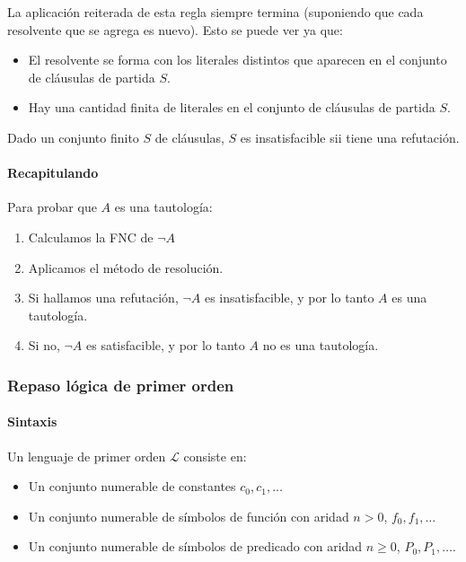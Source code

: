 La aplicación reiterada de esta regla siempre termina (suponiendo que cada resolvente que se agrega es nuevo). Esto se puede ver ya que:

\begin{itemize}
  \item El resolvente se forma con los literales distintos que aparecen en el conjunto de cláusulas de partida $S$.
  \item Hay una cantidad finita de literales en el conjunto de cláusulas de partida $S$.
\end{itemize}

\begin{teo}
  Dado un conjunto finito $S$ de cláusulas, $S$ es insatisfacible sii tiene una refutación.
\end{teo}

\paragraph{Recapitulando}

Para probar que $A$ es una tautología:
\begin{enumerate}
  \item Calculamos la FNC de $\lnot A$
  \item Aplicamos el método de resolución.
  \item Si hallamos una refutación, $\lnot A$ es insatisfacible, y por lo tanto $A$ es una tautología.
  \item Si no, $\lnot A$ es satisfacible, y por lo tanto $A$ no es una tautología.
\end{enumerate}

\subsubsection{Repaso lógica de primer orden}

\paragraph{Sintaxis}

Un lenguaje de primer orden $\mathcal{L}$ consiste en:

\begin{itemize}
  \item Un conjunto numerable de constantes $c_0, c_1, \dots$
  \item Un conjunto numerable de símbolos de función con aridad $n > 0$, $f_0, f_1, \dots$
  \item Un conjunto numerable de símbolos de predicado con aridad $n \geq 0$, $P_0, P_1, \dots$.
\end{itemize}

